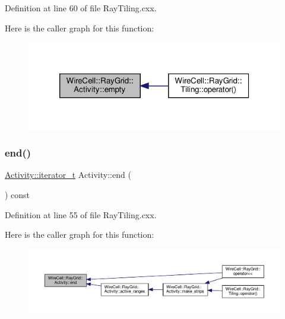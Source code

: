 Definition at line 60 of file Ray\+Tiling.\+cxx.

Here is the caller graph for this function\+:
\nopagebreak
\begin{figure}[H]
\begin{center}
\leavevmode
\includegraphics[width=320pt]{class_wire_cell_1_1_ray_grid_1_1_activity_a3b387437e1942ce62001daa39cd1631f_icgraph}
\end{center}
\end{figure}
\mbox{\label{class_wire_cell_1_1_ray_grid_1_1_activity_acb7cccddf07994a3bdc300dfb818dbf8}} 
\subsubsection{\texorpdfstring{end()}{end()}}
{\footnotesize\ttfamily \hyperlink{class_wire_cell_1_1_ray_grid_1_1_activity_a4e6dc9c676d517a5819962b10a2638fe}{Activity\+::iterator\+\_\+t} Activity\+::end (\begin{DoxyParamCaption}{ }\end{DoxyParamCaption}) const}



Definition at line 55 of file Ray\+Tiling.\+cxx.

Here is the caller graph for this function\+:
\nopagebreak
\begin{figure}[H]
\begin{center}
\leavevmode
\includegraphics[width=350pt]{class_wire_cell_1_1_ray_grid_1_1_activity_acb7cccddf07994a3bdc300dfb818dbf8_icgraph}
\end{center}
\end{figure}
\mbox{\label{class_wire_cell_1_1_ray_grid_1_1_activity_a871b9e9a8f3d3fbc728ce1c50ef39ece}} 
